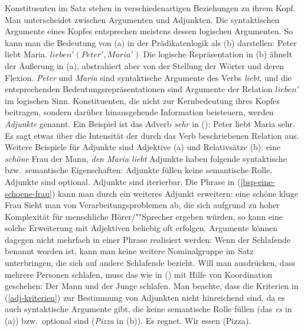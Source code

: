 Konstituenten im Satz stehen in verschiedenartigen Beziehungen zu ihrem Kopf.
Man unterscheidet zwischen Argumenten und Adjunkten. Die syntaktischen Argumente
eines Kopfes entsprechen meistens dessen logischen Argumenten. So kann man
die Bedeutung von (a) in der Prädikatenlogik als (b) darstellen:
\eal
\ex Peter liebt Maria.
\ex $lieben'(Peter', Maria')$
\zl
Die logische Repräsentation in (b) ähnelt der Äußerung in (a),
abstrahiert aber von der Stellung der Wörter und deren Flexion.
\emph{Peter} und \emph{Maria} sind syntaktische Argumente des Verbs \emph{liebt},
und die entsprechenden Bedeutungsrepräsentationen sind Argumente der Relation $lieben'$
im logischen Sinn. 
Konstituenten, die nicht zur Kernbedeutung ihres Kopfes beitragen,
sondern darüber hinausgehende Information beisteuern, werden \emph{Adjunkte}
genannt. Ein Beispiel ist das Adverb \emph{sehr} in ():
\ea
Peter liebt Maria sehr.
\z
Es sagt etwas über die Intensität der durch das Verb beschriebenen Relation aus.
Weitere Beispiele für Adjunkte sind Adjektive (a) und Relativsätze (b):
\eal
\ex\label{bsp-eine-schoene-frau}
eine \emph{schöne} Frau
\ex der Mann, \emph{den Maria liebt}
\zl
Adjunkte haben folgende syntaktische bzw.\ semantische Eigenschaften:
\eal
\label{adj-kriterien}
\ex Adjunkte füllen keine semantische Rolle.
\ex Adjunkte sind optional.
\ex Adjunkte sind iterierbar.
\zl
Die Phrase in (\ref{bsp-eine-schoene-frau}) kann man durch ein weiteres Adjunkt erweitern:
\ea
eine schöne kluge Frau
\z
Sieht man von Verarbeitungsproblemen ab, die sich aufgrund zu hoher Komplexität
für menschliche Hörer/""Sprecher ergeben würden, so kann eine solche Erweiterung
mit Adjektiven beliebig oft erfolgen. Argumente können dagegen nicht mehrfach 
in einer Phrase realisiert werden:
\z
Wenn der Schlafende benannt worden ist, kann man keine weitere Nominalgruppe
im Satz unterbringen, die sich auf andere Schlafende bezieht. Will man ausdrücken,
dass mehrere Personen schlafen, muss das wie in () mit Hilfe von
Koordination geschehen:
\ea
Der Mann und der Junge schlafen.
\z
Man beachte, dass die Kriterien in (\ref{adj-kriterien}) zur Bestimmung von Adjunkten
nicht hinreichend sind, da es auch syntaktische
Argumente gibt, die keine semantische Rolle füllen (das \emph{es} in (a)) bzw.\ optional
sind (\emph{Pizza} in (b)).
\eal
\ex Es regnet.
\ex Wir essen (Pizza).
\zl

